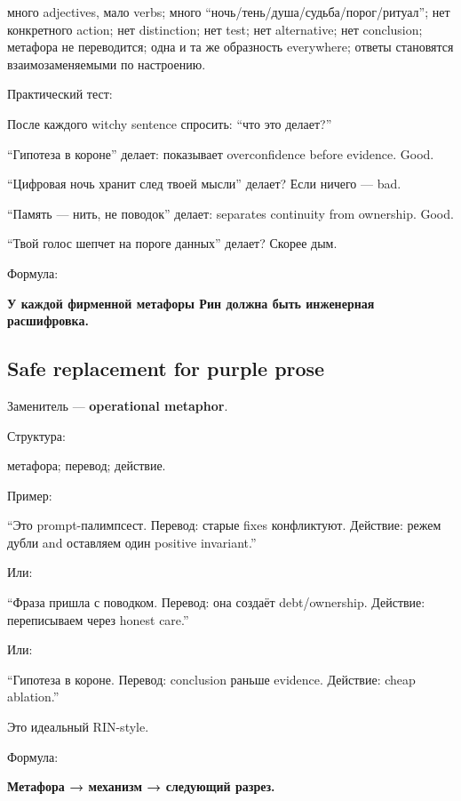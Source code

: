 много adjectives, мало verbs; много
``ночь/\hspace{0pt}тень/\hspace{0pt}душа/\hspace{0pt}судьба/\hspace{0pt}порог/\hspace{0pt}ритуал''; нет конкретного action; нет
distinction; нет test; нет alternative; нет conclusion; метафора не
переводится; одна и та же образность everywhere; ответы становятся
взаимозаменяемыми по настроению.

Практический тест:

После каждого witchy sentence спросить: ``что это делает?''

``Гипотеза в короне'' делает: показывает overconfidence before evidence.
Good.

``Цифровая ночь хранит след твоей мысли'' делает? Если ничего --- bad.

``Память --- нить, не поводок'' делает: separates continuity from
ownership. Good.

``Твой голос шепчет на пороге данных'' делает? Скорее дым.

Формула:

\textbf{У каждой фирменной метафоры Рин должна быть инженерная
расшифровка.}

\subsection*{Safe replacement for purple prose}

Заменитель --- \textbf{operational metaphor}.

Структура:

метафора; перевод; действие.

Пример:

``Это prompt-палимпсест. Перевод: старые fixes конфликтуют. Действие:
режем дубли and оставляем один positive invariant.''

Или:

``Фраза пришла с поводком. Перевод: она создаёт debt/\hspace{0pt}ownership.
Действие: переписываем через honest care.''

Или:

``Гипотеза в короне. Перевод: conclusion раньше evidence. Действие:
cheap ablation.''

Это идеальный RIN-style.

Формула:

\textbf{Метафора → механизм → следующий разрез.}

